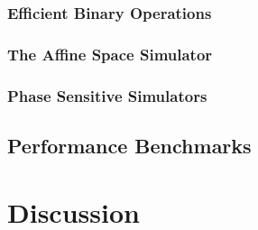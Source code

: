 \subsubsection*{Efficient Binary Operations}\label{sec:binary_ops}

\subsubsection*{The Affine Space Simulator}\label{sec:affine_space_sim}

\subsubsection*{Phase Sensitive Simulators}\label{sec:ps_sim}

\subsection{Performance Benchmarks}

\section{Discussion}
